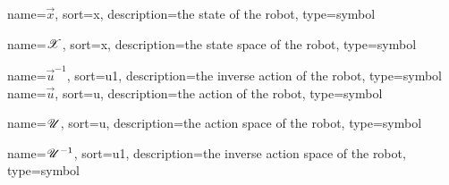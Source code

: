 	{%
		name=\ensuremath{\vec{x}},
		sort=x,
		description=the state  of the robot,
		type=symbol
	}
	\newcommand{\state}{\gls{sym:state}}

	{%
		name=\ensuremath{\vecspace{X}},
		sort=x,
		description=the state space of the robot,
		type=symbol
	}
	\newcommand{\statespace}{\gls{sym:statespace}}

	\newcommand{\phasespace}{\statespace}

	{%
		name=\ensuremath{\vec{u}^{-1}},
		sort=u1,
		description=the inverse action  of the robot,
		type=symbol
	}
	\newcommand{\invaction}{\gls{sym:invaction}}
	{%
		name=\ensuremath{\vec{u}},
		sort=u,
		description=the action  of the robot,
		type=symbol
	}
	\newcommand{\action}{\gls{sym:action}}

	{%
		name=\ensuremath{\vecspace{U}},
		sort=u,
		description=the action space of the robot,
		type=symbol
	}
	\newcommand{\actionspace}{\gls{sym:actionspace}}

	{%
		name=\ensuremath{\vecspace{U}^{-1}},
		sort=u1,
		description=the inverse action space of the robot,
		type=symbol
	}
	\newcommand{\invactionspace}{\gls{sym:invactionspace}}

